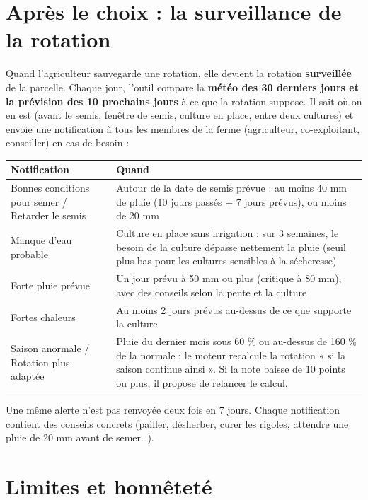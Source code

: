 \documentclass[11pt,a4paper]{article}
\begin{document}
\section{Après le choix : la surveillance de la rotation}\label{sec:surveillance}

Quand l'agriculteur sauvegarde une rotation, elle devient la rotation \textbf{surveillée} de la parcelle. Chaque
jour, l'outil compare la \textbf{météo des 30 derniers jours et la prévision des 10 prochains jours} à ce que la
rotation suppose. Il sait où on en est (avant le semis, fenêtre de semis, culture en place, entre deux cultures)
et envoie une notification à tous les membres de la ferme (agriculteur, co-exploitant, conseiller) en cas de besoin :

\begin{center}
\begin{tabularx}{\textwidth}{L{4.2cm}Y}
\toprule
\textbf{Notification} & \textbf{Quand} \\
\midrule
Bonnes conditions pour semer / Retarder le semis & Autour de la date de semis prévue : au moins 40 mm de pluie (10 jours passés + 7 jours prévus), ou moins de 20 mm \\
Manque d'eau probable & Culture en place sans irrigation : sur 3 semaines, le besoin de la culture dépasse nettement la pluie (seuil plus bas pour les cultures sensibles à la sécheresse) \\
Forte pluie prévue & Un jour prévu à 50 mm ou plus (critique à 80 mm), avec des conseils selon la pente et la culture \\
Fortes chaleurs & Au moins 2 jours prévus au-dessus de ce que supporte la culture \\
Saison anormale / Rotation plus adaptée & Pluie du dernier mois sous 60 \% ou au-dessus de 160 \% de la normale : le moteur recalcule la rotation « si la saison continue ainsi ». Si la note baisse de 10 points ou plus, il propose de relancer le calcul. \\
\bottomrule
\end{tabularx}
\end{center}

Une même alerte n'est pas renvoyée deux fois en 7 jours. Chaque notification contient des conseils concrets
(pailler, désherber, curer les rigoles, attendre une pluie de 20 mm avant de semer…).

\section{Limites et honnêteté}
\end{document}
